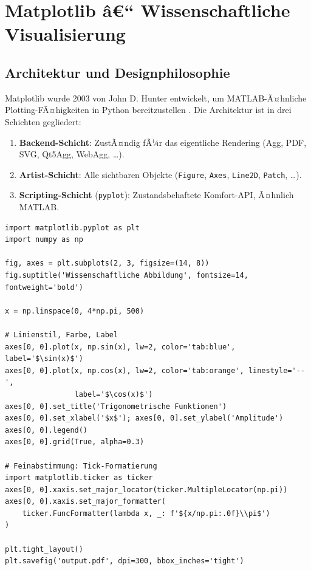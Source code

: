 \documentclass[12pt, a4paper]{article}
\begin{document}
\section{Matplotlib â€“ Wissenschaftliche Visualisierung}
\label{sec:matplotlib}

\subsection{Architektur und Designphilosophie}
\label{subsec:mpl-arch}

Matplotlib wurde 2003 von John D. Hunter entwickelt, um MATLAB-Ã¤hnliche
Plotting-FÃ¤higkeiten in Python bereitzustellen \cite{hunter2007matplotlib}.
Die Architektur ist in drei Schichten gegliedert:

\begin{enumerate}
  \item \textbf{Backend-Schicht}: ZustÃ¤ndig fÃ¼r das eigentliche Rendering
        (Agg, PDF, SVG, Qt5Agg, WebAgg, \ldots).
  \item \textbf{Artist-Schicht}: Alle sichtbaren Objekte (\texttt{Figure},
        \texttt{Axes}, \texttt{Line2D}, \texttt{Patch}, \ldots).
  \item \textbf{Scripting-Schicht} (\texttt{pyplot}): Zustandsbehaftete
        Komfort-API, Ã¤hnlich MATLAB.
\end{enumerate}

\begin{lstlisting}[caption={Objektbasierte Matplotlib-API (empfohlen)}]
import matplotlib.pyplot as plt
import numpy as np

fig, axes = plt.subplots(2, 3, figsize=(14, 8))
fig.suptitle('Wissenschaftliche Abbildung', fontsize=14, fontweight='bold')

x = np.linspace(0, 4*np.pi, 500)

# Linienstil, Farbe, Label
axes[0, 0].plot(x, np.sin(x), lw=2, color='tab:blue', label='$\sin(x)$')
axes[0, 0].plot(x, np.cos(x), lw=2, color='tab:orange', linestyle='--',
                label='$\cos(x)$')
axes[0, 0].set_title('Trigonometrische Funktionen')
axes[0, 0].set_xlabel('$x$'); axes[0, 0].set_ylabel('Amplitude')
axes[0, 0].legend()
axes[0, 0].grid(True, alpha=0.3)

# Feinabstimmung: Tick-Formatierung
import matplotlib.ticker as ticker
axes[0, 0].xaxis.set_major_locator(ticker.MultipleLocator(np.pi))
axes[0, 0].xaxis.set_major_formatter(
    ticker.FuncFormatter(lambda x, _: f'${x/np.pi:.0f}\\pi$')
)

plt.tight_layout()
plt.savefig('output.pdf', dpi=300, bbox_inches='tight')
\end{lstlisting}
\end{document}
